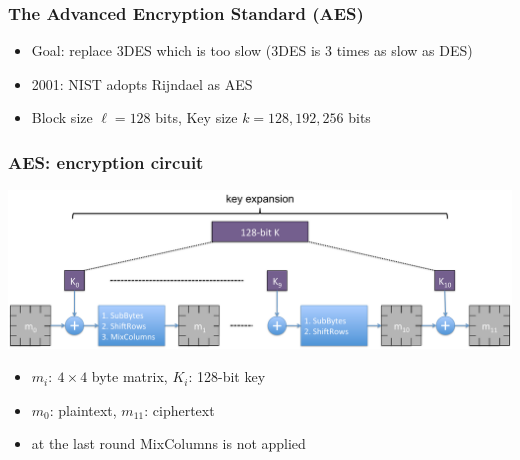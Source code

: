 \documentclass[aspectratio=169, lualatex, handout, 10pt,dvipsnames,svgnames]{beamer} %
\begin{document}
\begin{frame}

  \frametitle{The Advanced Encryption Standard (AES)}

  \begin{itemize}
  \item Goal: replace 3DES which is too slow (3DES is 3 times as slow as DES)
    \bigskip{}
  \item 2001: NIST adopts Rijndael as AES
    \bigskip{}
  \item Block size $\ell = 128$ bits, Key size $k=128, 192, 256$ bits
  
  \end{itemize}

\end{frame}

\begin{frame}

  \frametitle{AES: encryption circuit}

  \includegraphics[scale=0.275]{Images/AES.pdf}
  \bigskip{}

  \begin{itemize}
  \item $m_i:\ 4\times 4$ byte matrix, $K_i$: 128-bit key
  \item $m_0$: plaintext, $m_{11}$: ciphertext
  \item at the last round MixColumns is not applied
  \end{itemize}

  
\end{frame}
\end{document}
